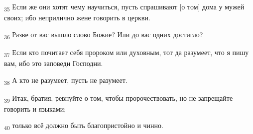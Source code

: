 \begin{tcolorbox}
\textsubscript{35} Если же они хотят чему научиться, пусть спрашивают [о том] дома у мужей своих; ибо неприлично жене говорить в церкви.
\end{tcolorbox}
\begin{tcolorbox}
\textsubscript{36} Разве от вас вышло слово Божие? Или до вас одних достигло?
\end{tcolorbox}
\begin{tcolorbox}
\textsubscript{37} Если кто почитает себя пророком или духовным, тот да разумеет, что я пишу вам, ибо это заповеди Господни.
\end{tcolorbox}
\begin{tcolorbox}
\textsubscript{38} А кто не разумеет, пусть не разумеет.
\end{tcolorbox}
\begin{tcolorbox}
\textsubscript{39} Итак, братия, ревнуйте о том, чтобы пророчествовать, но не запрещайте говорить и языками;
\end{tcolorbox}
\begin{tcolorbox}
\textsubscript{40} только всё должно быть благопристойно и чинно.
\end{tcolorbox}
